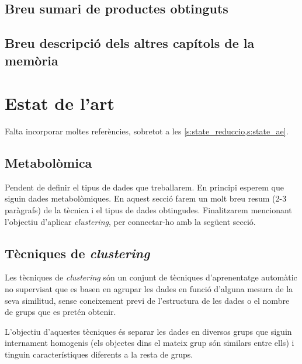 \documentclass[CAT,BIB]{TFUOC}%
\newcommand{\todo}[1]{
            \begin{tcolorbox}[title=ToDo!, colback=red!5!white, colframe=red!50!black, coltext=red!50!black]
            #1
            \end{tcolorbox}}
\begin{document}
    \section{Breu sumari de productes obtinguts}

    \section{Breu descripció dels altres capítols de la memòria}

\chapter{Estat de l'art}
\label{s:state}

\todo{Falta incorporar moltes referències, sobretot a les \cref{s:state_reduccio,s:state_ae}.}

    \section{Metabolòmica}
    \label{s:state_metabol}

\todo{
    Pendent de definir el tipus de dades que treballarem. En principi esperem que siguin dades metabolòmiques. En aquest secció farem un molt breu resum (2-3 paràgrafs) de la tècnica i el tipus de dades obtingudes. Finalitzarem mencionant l'objectiu d'aplicar \textit{clustering}, per connectar-ho amb la següent secció.
}

    \section{Tècniques de \textit{clustering}}
    \label{s:state_cluster}

        Les tècniques de \textit{clustering} són un conjunt de tècniques d'aprenentatge automàtic no supervisat que es basen en agrupar les dades en funció d'alguna mesura de la seva similitud, sense coneixement previ de l'estructura de les dades o el nombre de grups que es pretén obtenir.

        L'objectiu d'aquestes tècniques és separar les dades en diversos grups que siguin internament homogenis (els objectes dins el mateix grup són similars entre ells) i tinguin característiques diferents a la resta de grups.
\end{document}
